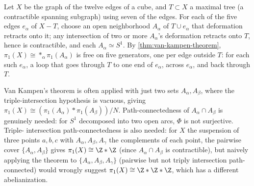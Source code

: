 \begin{example}
\label{ex:cube-graph-fundamental-group-free}
Let $X$ be the graph of the twelve edges of a cube, and $T \subset X$ a maximal
tree (a contractible spanning subgraph) using seven of the edges. For each of the
five edges $e_\alpha$ of $X - T$, choose an open neighborhood $A_\alpha$ of $T\cup e_\alpha$ that
deformation retracts onto it; any intersection of two or more $A_\alpha$'s deformation
retracts onto $T$, hence is contractible, and each $A_\alpha \simeq S^1$. By
\cref{thm:van-kampen-theorem}, $\pi_1(X) \cong *_\alpha \pi_1(A_\alpha)$ is free on five generators, one
per edge outside $T$: for each such $e_\alpha$, a loop that goes through $T$ to one end of
$e_\alpha$, across $e_\alpha$, and back through $T$.


\end{example}

Van Kampen's theorem is often applied with just two sets $A_\alpha, A_\beta$, where the
triple-intersection hypothesis is vacuous, giving
$\pi_1(X) \cong (\pi_1(A_\alpha)*\pi_1(A_\beta))/N$. Path-connectedness of $A_\alpha\cap A_\beta$ is genuinely
needed: for $S^1$ decomposed into two open arcs, $\Phi$ is not surjective. Triple-
intersection path-connectedness is also needed: for $X$ the suspension of three
points $a,b,c$ with $A_\alpha,A_\beta,A_\gamma$ the complements of each point, the pairwise cover
$\{A_\alpha,A_\beta\}$ gives $\pi_1(X) \cong \Z*\Z$ (since $A_\alpha\cap A_\beta$ is contractible), but naively
applying the theorem to $\{A_\alpha,A_\beta,A_\gamma\}$ (pairwise but not triply intersection
path-connected) would wrongly suggest $\pi_1(X)\cong\Z*\Z*\Z$, which has a different
abelianization.



